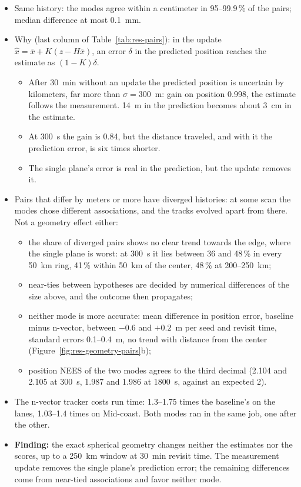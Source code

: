 \begin{itemize}
    \item Same history: the modes agree within a centimeter in 95--99.9\,\% of the pairs; median difference at most 0.1~mm.
    \item Why (last column of Table~\ref{tab:res-pairs}): in the update $\hat{x} = \bar{x} + K(z - H\bar{x})$, an error $\delta$ in the predicted position reaches the estimate as $(1 - K)\delta$.
    \begin{itemize}
        \item After 30~min without an update the predicted position is uncertain by kilometers, far more than $\sigma = 300$~m: gain on position 0.998, the estimate follows the measurement. 14~m in the prediction becomes about 3~cm in the estimate.
        \item At 300~s the gain is 0.84, but the distance traveled, and with it the prediction error, is six times shorter.
        \item The single plane's error is real in the prediction, but the update removes it.
    \end{itemize}
    \item Pairs that differ by meters or more have diverged histories: at some scan the modes chose different associations, and the tracks evolved apart from there. Not a geometry effect either:
    \begin{itemize}
        \item the share of diverged pairs shows no clear trend towards the edge, where the single plane is worst: at 300~s it lies between 36 and 48\,\% in every 50~km ring, 41\,\% within 50~km of the center, 48\,\% at 200--250~km;
        \item near-ties between hypotheses are decided by numerical differences of the size above, and the outcome then propagates;
        \item neither mode is more accurate: mean difference in position error, baseline minus n-vector, between $-0.6$ and $+0.2$~m per seed and revisit time, standard errors 0.1--0.4~m, no trend with distance from the center (Figure~\ref{fig:res-geometry-pairs}b);
        \item position NEES of the two modes agrees to the third decimal (2.104 and 2.105 at 300~s, 1.987 and 1.986 at 1800~s, against an expected 2).
    \end{itemize}
    \item The n-vector tracker costs run time: 1.3--1.75 times the baseline's on the lanes, 1.03--1.4 times on Mid-coast. Both modes ran in the same job, one after the other.
    \item \textbf{Finding:} the exact spherical geometry changes neither the estimates nor the scores, up to a 250~km window at 30~min revisit time. The measurement update removes the single plane's prediction error; the remaining differences come from near-tied associations and favor neither mode.
\end{itemize}

